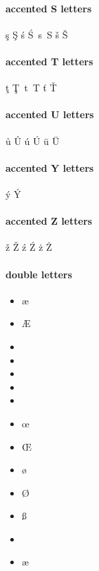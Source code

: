 \documentclass[14pt]{article}%
\begin{document}
\paragraph{accented S letters}
\c{s}
\c{S}
\'{s}
\'{S}
\,{s}
\,{S}
\v{s}
\v{S}

\paragraph{accented T letters}
\c{t}
\c{T}
\,{t}
\,{T}
\v{t}
\v{T}

\paragraph{accented U letters}
\r{u}
\r{U}
\'{u}
\'{U}
\"{u}
\"{U}

\paragraph{accented Y letters}
\'{y}
\'{Y}

\paragraph{accented Z letters}
\v{z}
\v{Z}
\'{z}
\'{Z}
\.{z}
\.{Z}

\paragraph{double letters}
\begin{itemize}
  \item \ae
  \item \AE
  \item \dh
  \item \DH
  \item \dj
  \item \ng
  \item \NG
  \item \oe
  \item \OE
  \item \o
  \item \O
  \item \ss
  \item {\SS}
  \item \ae
\end{itemize}
\end{document}
